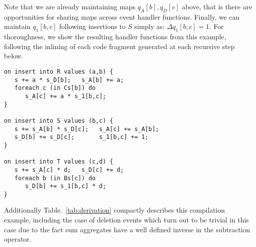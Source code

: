 \noindent Note that we are already maintaining maps $q_A[b], q_D[c]$ above, that
is there are opportunities for sharing maps across event handler functions.
Finally, we can maintain $q_1[b,c]$ following insertions to $S$ simply as:
$\Delta q_1[b,c] = 1$.
For thoroughness, we show the resulting handler functions from this example,
following the inlining of each code fragment generated at each recursive step
below.

\begin{verbatim}
on insert into R values (a,b) {
   s += a * s_D[b];   s_A[b] += a;
   foreach c (in Cs[b]) do
      s_A[c] += a * s_1[b,c];
}

on insert into S values (b,c) {
   s += s_A[b] * s_D[c];   s_A[c] += s_A[b];
   s_D[b] += s_D[c];       s_1[b,c] += 1;
}

on insert into T values (c,d) {
   s += s_A[c] * d;   s_D[c] += d;
   foreach b (in Bs[c]) do
      s_D[b] += s_1[b,c] * d;
}
\end{verbatim}

Additionally Table.~\ref{tab:derivation} compactly describes this compilation
example, including the case of deletion events which turn out to be trivial in
this case due to the fact sum aggregates have a well defined inverse in the
subtraction operator.


